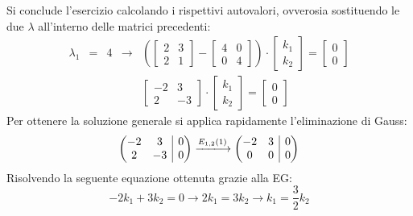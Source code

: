 \documentclass[a4paper]{article}
\makeatletter
\newenvironment{rowequmat}[1]{\left(\array{@{}#1@{}}}{\endarray\right)}
\makeatother
\begin{document}
	Si conclude l'esercizio calcolando i rispettivi autovalori, ovverosia sostituendo le due $\lambda$ all'interno delle matrici precedenti:
	\begin{equation*}
		\begin{array}{rclcl}
			\lambda_{1} &=& 4 &\longrightarrow&
			\left(
				\begin{bmatrix}
					2 & 3 \\ 2 & 1
				\end{bmatrix}
				-
				\begin{bmatrix}
					4 & 0 \\ 0 & 4
				\end{bmatrix}
			\right) \cdot
			\begin{bmatrix}
				k_{1} \\ k_{2}
			\end{bmatrix} 
			= 
			\begin{bmatrix}
				0 \\ 0
			\end{bmatrix} \\ [1.5em]
			&&&&
			\begin{bmatrix}
				-2 & 3 \\ 2 & -3
			\end{bmatrix}
			\cdot
			\begin{bmatrix}
				k_{1} \\ k_{2}
			\end{bmatrix}
			=
			\begin{bmatrix}
				0 \\ 0
			\end{bmatrix}
		\end{array}
	\end{equation*}
	Per ottenere la soluzione generale si applica rapidamente l'eliminazione di Gauss:
	\begin{equation*}
		\begin{rowequmat}{c c | c}
			-2 & 3 & 0 \\
			2 & -3 & 0
		\end{rowequmat}
		\xlongrightarrow{E_{1,2}\left(1\right)}
		\begin{rowequmat}{c c | c}
			-2 & 3 & 0 \\
			0 & 0 & 0
		\end{rowequmat}
	\end{equation*}
	Risolvendo la seguente equazione ottenuta grazie alla EG:
	\begin{equation*}
		-2k_{1} + 3k_{2} = 0 \longrightarrow 2k_{1} = 3k_{2} \longrightarrow k_{1} = \dfrac{3}{2}k_{2}
	\end{equation*}
\end{document}
